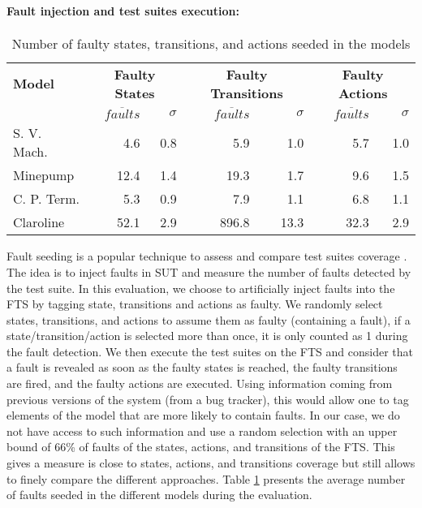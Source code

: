 \paragraph{Fault injection and test suites execution:}

\begin{table}
	\centering
	\caption{Number of faulty states, transitions, and actions seeded in the models}
	\begin{small}
	\begin{tabular}{lrrrrrr}
		\hline
		\textbf{Model}	& \multicolumn{2}{c}{\textbf{Faulty States}}	& \multicolumn{2}{c}{\textbf{Faulty Transitions}} & \multicolumn{2}{c}{\textbf{Faulty Actions}} \\
						& \textit{$\overline{faults}$} & \textit{$\sigma$}	& \textit{$\overline{faults}$} & \textit{$\sigma$}	& \textit{$\overline{faults}$} & \textit{$\sigma$}\\
		\hline 
		S. V. Mach.		& 4.6	& 0.8	& 5.9	& 1.0	& 5.7	& 1.0	\\
		Minepump			& 12.4	& 1.4	& 19.3	& 1.7	& 9.6	& 1.5	\\
		C. P. Term.		& 5.3	& 0.9	& 7.9	& 1.1	& 6.8	& 1.1	\\
		Claroline		& 52.1	& 2.9	& 896.8	& 13.3	& 32.3	& 2.9	\\
		\hline
	\end{tabular}
	\end{small}
	\label{tab:avg:faults}
\end{table}

Fault seeding is a popular technique to assess and compare test suites coverage \cite{Andrews2005,Andrews2006,Mathur2008}. The idea is to inject faults in SUT and measure the number of faults detected by the test suite. 
In this evaluation, we choose to artificially inject faults into the FTS by tagging state, transitions and actions as faulty. We randomly select states, transitions, and actions to assume them as faulty (\ie containing a fault), if a state/transition/action is selected more than once, it is only counted as 1 during the fault detection. We then execute the test suites on the FTS and consider that a fault is revealed as soon as the faulty states is reached, the faulty transitions are fired, and the faulty actions are executed.
Using information coming from previous versions of the system (\ie from a bug tracker), this would allow one to tag elements of the model that are more likely to contain faults.
In our case, we do not have access to such information and use a random selection with an upper bound of 66\% of faults of the states, actions, and transitions of the FTS. This gives a measure is close to states, actions, and transitions coverage but still allows to finely compare the different approaches. Table \ref{tab:avg:faults} presents the average number of faults seeded in the different models during the evaluation.

